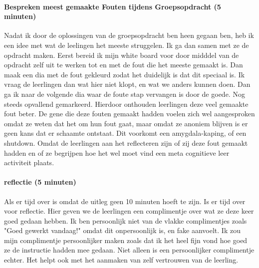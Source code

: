                 \paragraph{Bespreken meest gemaakte Fouten tijdens Groepsopdracht (5 minuten)}
                    Nadat ik door de oplossingen van de groepsopdracht ben heen gegaan ben, heb ik een idee met wat de leelingen het meeste struggelen. Ik ga dan samen met ze de opdracht maken. Eerst bereid ik mijn white board voor door midddel van de opdracht zelf uit te werken tot en met de fout die het meeste gemaakt is. Dan maak een dia met de fout gekleurd zodat het duidelijk is dat dit speciaal is. Ik vraag de leerlingen dan wat hier niet klopt, en wat we anders kunnen doen. Dan ga ik naar de volgende dia waar de foute stap vervangen is door de goede. Nog steeds opvallend gemarkeerd. Hierdoor onthouden leerlingen deze veel gemaakte fout beter.\cite{Visual-Learners-are-the-most-common} De gene die deze fouten gemaakt hadden voelen zich wel aangesproken omdat ze weten dat het om hun fout gaat, maar omdat ze anoniem blijven is er geen kans dat er schaamte ontstaat. Dit voorkomt een amygdala-kaping, of een shutdown.\cite{more-homework-equals-bad}\cite{autisme-shutdowns} Omdat de leerlingen aan het reflecteren zijn of zij deze fout gemaakt hadden en of ze begrijpen hoe het wel moet vind een meta cognitieve leer activiteit plaats.\cite{NAME-ME}
                    
                \paragraph{reflectie (5 minuten)}
                    Als er tijd over is omdat de uitleg geen 10 minuten hoeft te zijn. Is er tijd over voor reflectie. Hier geven we de leerlingen een complimentje over wat ze deze keer goed gedaan hebben. Ik ben persoonlijk niet van de vlakke complimentjes zoals "Goed gewerkt vandaag!" omdat dit onpersoonlijk is, en fake aanvoelt. Ik zou mijn complimentje persoonlijker maken zoals dat ik het heel fijn vond hoe goed ze de instructie hadden mee gedaan. Niet alleen is een persoonlijker complimentje echter. Het helpt ook met het aanmaken van zelf vertrouwen van de leerling.\cite{compliments-how-to}


